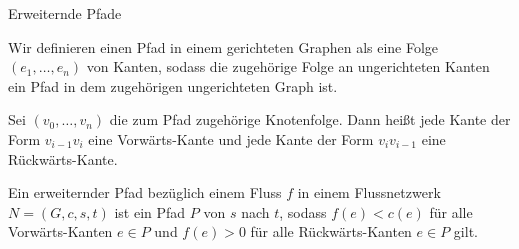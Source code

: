 \documentclass[aspectratio=169]{beamer}
\begin{document}
  \begin{frame}{Erweiternde Pfade}

  \begin{definition*}[Pfad]
    Wir definieren einen Pfad in einem gerichteten Graphen als eine Folge
    $(e_1,\dots,e_n)$ von Kanten, sodass die zugehörige Folge an ungerichteten
    Kanten ein Pfad in dem zugehörigen ungerichteten Graph ist.
    \pause


    Sei $(v_0,\dots,v_n)$ die zum Pfad zugehörige Knotenfolge.
    Dann heißt jede Kante der Form $v_{i-1}v_{i}$ eine Vorwärts-Kante
    und jede Kante der Form $v_{i}v_{i-1}$ eine Rückwärts-Kante.

  \end{definition*}

  \pause

  \begin{definition*}
    Ein erweiternder Pfad bezüglich einem Fluss $f$ in einem Flussnetzwerk
    $N = (G,c,s,t)$ ist ein Pfad $P$ von $s$ nach $t$,
    sodass $f(e) < c(e)$ für alle Vorwärts-Kanten $e \in P$ und $f(e) > 0$
    für alle Rückwärts-Kanten $e \in P$ gilt.
  \end{definition*}

  \end{frame}
\end{document}
